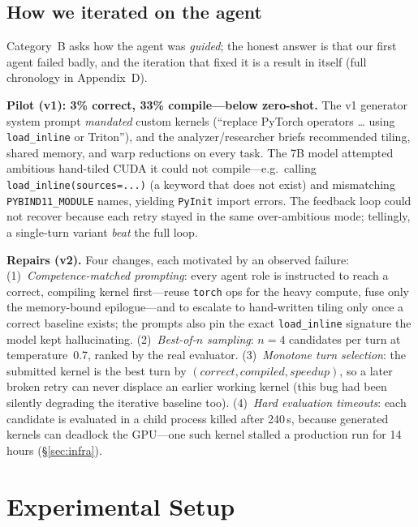 \documentclass[conference]{IEEEtran}
\begin{document}
\subsection{How we iterated on the agent}\label{sec:iterate}

Category~B asks how the agent was \emph{guided}; the honest answer is that our
first agent failed badly, and the iteration that fixed it is a result in itself
(full chronology in Appendix~D).

\textbf{Pilot (v1): 3\% correct, 33\% compile---below zero-shot.} The v1 generator
system prompt \emph{mandated} custom kernels (``replace PyTorch operators \dots
using \texttt{load\_inline} or Triton''), and the analyzer/researcher briefs
recommended tiling, shared memory, and warp reductions on every task. The 7B model
attempted ambitious hand-tiled CUDA it could not compile---e.g.\ calling
\texttt{load\_inline(sources=...)} (a keyword that does not exist) and mismatching
\texttt{PYBIND11\_MODULE} names, yielding \texttt{PyInit} import errors. The
feedback loop could not recover because each retry stayed in the same
over-ambitious mode; tellingly, a single-turn variant \emph{beat} the full loop.

\textbf{Repairs (v2).} Four changes, each motivated by an observed failure:
(1)~\emph{Competence-matched prompting}: every agent role is instructed to reach a
correct, compiling kernel first---reuse \texttt{torch} ops for the heavy compute,
fuse only the memory-bound epilogue---and to escalate to hand-written tiling only
once a correct baseline exists; the prompts also pin the exact
\texttt{load\_inline} signature the model kept hallucinating.
(2)~\emph{Best-of-$n$ sampling}: $n{=}4$ candidates per turn at temperature~0.7,
ranked by the real evaluator. (3)~\emph{Monotone turn selection}: the submitted
kernel is the best turn by $(\textit{correct},\textit{compiled},\textit{speedup})$,
so a later broken retry can never displace an earlier working kernel (this bug had
been silently degrading the iterative baseline too). (4)~\emph{Hard evaluation
timeouts}: each candidate is evaluated in a child process killed after 240\,s,
because generated kernels can deadlock the GPU---one such kernel stalled a
production run for 14 hours (\S\ref{sec:infra}).

\section{Experimental Setup}
\end{document}
